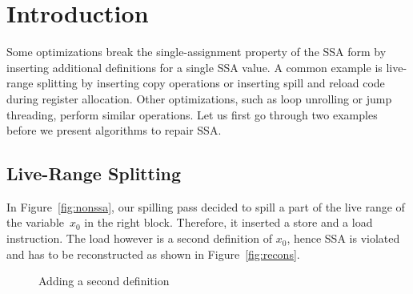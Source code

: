 \section{Introduction}

Some optimizations break the single-assignment property of the SSA form by inserting additional definitions for a single SSA value.
A common example is live-range splitting by inserting copy operations or inserting spill and reload code during register allocation.
Other optimizations, such as loop unrolling or jump threading, perform similar operations.
Let us first go through two examples before we present algorithms to repair SSA.

\subsection{Live-Range Splitting}

In Figure~\ref{fig:nonssa}, our spilling pass decided to spill a part of the live range of the variable~$x_0$ in the right block.
Therefore, it inserted a store and a load instruction. 
The load however is a second definition of $x_0$, hence SSA is violated and has to be reconstructed as shown in Figure~\ref{fig:recons}.

\begin{figure}[htbp]
	\centering
	\hfill
	\hfill
	\label{fig:ex1}
	\caption{Adding a second definition}
\end{figure}

